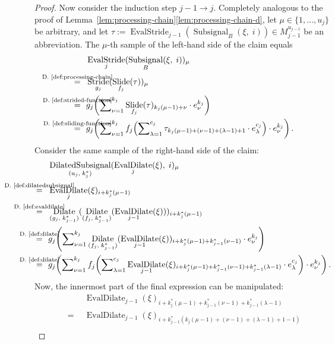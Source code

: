 \documentclass[journal]{IEEEtran}
\newcommand{\ROI}{B}
\newcommand{\discint}[2]{\{#1,\dotsc,#2\}}
\newcommand{\inint}[2]{\in\discint{#1}{#2}}
\DeclareMathOperator{\Subsignal}{Subsignal}
\DeclareMathOperator{\Slide}{Slide}
\DeclareMathOperator{\Stride}{Stride}
\DeclareMathOperator{\EvalStride}{EvalStride}
\newcommand{\equsing}[1]{\overset{\mathclap{\text{#1}}}{=}}
\DeclareMathOperator{\DilatedSubsignal}{DilatedSubsignal}
\DeclareMathOperator{\Dilate}{Dilate}
\DeclareMathOperator{\EvalDilate}{EvalDilate}
\begin{document}
\begin{proof}
Now consider the induction step $j - 1 \to j$.
Completely analogous to the proof of Lemma~\ref{lem:processing-chain}\ref{lem:processing-chain-d}, let $\mu\inint{1}{u_j}$ be arbitrary, and let $\tau := \EvalStride_{j - 1}(\Subsignal_\ROI(\xi,\;i))\in M_{j - 1}^{u_{j - 1}}$ be an abbreviation.
The $\mu$-th sample of the left-hand side of the claim equals
\begin{align*}
  & \EvalStride_j(\Subsignal_\ROI(\xi,\;i))_\mu\\
  \equsing{D.~\ref{def:processing-chain}}\ \ & \Stride_{g_j}(\Slide_{f_j}(\tau))_\mu\\
  \equsing{D.~\ref{def:strided-function}}\ \ & g_j\!\left( \sum\nolimits_{\nu = 1}^{k_j} \Slide_{f_j}(\tau)_{k_j(\mu - 1) + \nu}\cdot e_\nu^{k_j} \right)\\
  \equsing{D.~\ref{def:sliding-function}}\ \ & g_j\!\left( \sum\nolimits_{\nu = 1}^{k_j} f_j\!\left(\sum\nolimits_{\lambda = 1}^{c_j}  \tau_{k_j(\mu - 1) + (\nu - 1) + (\lambda - 1) + 1}\cdot e_\lambda^{c_j}\right)\cdot e_\nu^{k_j} \right)\text{.}
\end{align*}
Consider the same sample of the right-hand side of the claim:
\begin{align*}
  & \DilatedSubsignal_{(u_j,\; k_j^*)}(\EvalDilate_j(\xi),\; i)_\mu\\
  \equsing{D.~\ref{def:dilatedsubsignal}}\ \ & \EvalDilate_j(\xi)_{i + k_j^*(\mu - 1)}\\
  \equsing{D.~\ref{def:evaldilate}}\ \ & \Dilate_{(g_j,\; k_{j - 1}^*)}( \Dilate_{(f_j,\; k_{j - 1}^*)}( \EvalDilate_{j - 1}(\xi) ) )_{i + k_j^*(\mu - 1)}\\
  \equsing{D.~\ref{def:dilate}}\ \ & g_j\!\left( \sum\nolimits_{\nu = 1}^{k_j} \Dilate_{(f_j,\; k_{j - 1}^*)}( \EvalDilate_{j - 1}(\xi) )_{i + k_j^*(\mu - 1) + k_{j - 1}^*(\nu - 1)} \cdot e_\nu^{k_j} \right)\\
  \equsing{D.~\ref{def:dilate}}\ \ & g_j\!\left( \sum\nolimits_{\nu = 1}^{k_j} f_j\!\left(\sum\nolimits_{\lambda = 1}^{c_j} \EvalDilate_{j - 1}(\xi)_{i + k_j^*(\mu - 1) + k_{j - 1}^*(\nu - 1) + k_{j - 1}^*(\lambda - 1)}\cdot e_\lambda^{c_j}\right) \cdot e_\nu^{k_j} \right)\text{.}
\end{align*}
Now, the innermost part of the final expression can be manipulated:
\begin{align*}
  & \EvalDilate_{j - 1}(\xi)_{i + k_j^*(\mu - 1) + k_{j - 1}^*(\nu - 1) + k_{j - 1}^*(\lambda - 1)}\\
  =\ \ & \EvalDilate_{j - 1}(\xi)_{i + k_{j - 1}^*\left(k_j(\mu - 1) + (\nu - 1) + (\lambda - 1) + 1 - 1\right)}\\

\end{align*}
\end{proof}
\end{document}
